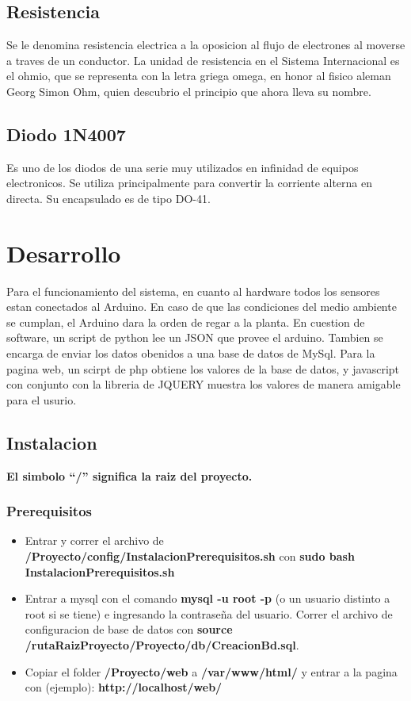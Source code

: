 \documentclass{article}
\begin{document}
\subsection{Resistencia}
Se le denomina resistencia electrica a la oposicion al flujo de electrones al moverse a traves de un conductor. La unidad de resistencia en el Sistema Internacional es el ohmio, que se representa con la letra griega omega, en honor al fisico aleman Georg Simon Ohm, quien descubrio el principio que ahora lleva su nombre.

\subsection{Diodo 1N4007}
Es uno de los diodos de una serie muy utilizados en infinidad de equipos electronicos. Se utiliza principalmente para convertir la corriente alterna en directa. Su encapsulado es de tipo DO-41. 

\newpage
\section{Desarrollo}
Para el funcionamiento del sistema, en cuanto al hardware todos los sensores estan conectados al Arduino. En caso de que las condiciones del medio ambiente se cumplan, el Arduino dara la orden de regar a la planta.
\newline En cuestion de software, un script de python lee un JSON que provee el arduino. Tambien se encarga de enviar los datos obenidos a una base de datos de MySql.
\newline Para la pagina web, un scirpt de php obtiene los valores de la base de datos, y javascript con conjunto con la libreria de JQUERY muestra los valores de manera amigable para el usurio.

\subsection{Instalacion}
\textbf{El simbolo ``/'' significa la raiz del proyecto.}

\subsubsection{Prerequisitos}

\begin{itemize}
	\item Entrar y correr el archivo de \textbf{/Proyecto/config/InstalacionPrerequisitos.sh} con \textbf{sudo bash InstalacionPrerequisitos.sh}
	\item Entrar a mysql con el comando \textbf{mysql -u root -p} (o un usuario distinto a root si se tiene) e ingresando la contrase\~na del usuario. Correr el archivo de configuracion de base de datos con \textbf{source /rutaRaizProyecto/Proyecto/db/CreacionBd.sql}.
	\item Copiar el folder \textbf{/Proyecto/web} a \textbf{/var/www/html/} y entrar a la pagina con (ejemplo): \textbf{http://localhost/web/}
\end{itemize}
\end{document}
